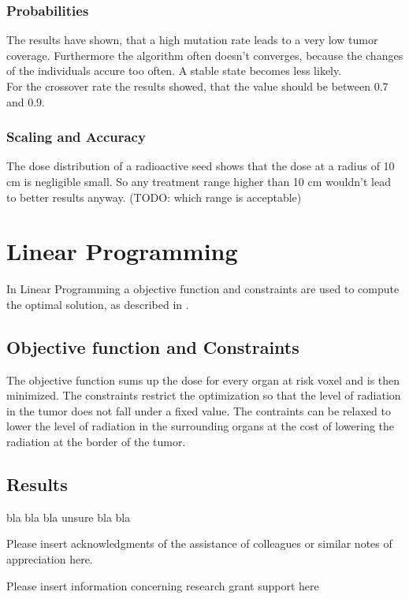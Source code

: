 \documentclass[USenglish,twocolumn]{article}
\begin{document}
\subsubsection{Probabilities} 
The results have shown, that a high mutation rate leads to a very low tumor coverage. Furthermore the algorithm often doesn't converges, because the changes of the individuals accure too often. A stable state becomes less likely. \\ For the crossover rate the results showed, that the value should be between 0.7 and 0.9.

\subsubsection{Scaling and Accuracy}
The dose distribution of a radioactive seed shows that the dose at a radius of 10 cm is negligible small. So any treatment range higher than 10 cm wouldn't lead to better results anyway. (TODO: which range is acceptable)

\section{Linear Programming}
In Linear Programming a objective function and constraints are used to compute the optimal solution, as described in \citep{2}.

\subsection{Objective function and Constraints}
The objective function sums up the dose for every organ at risk voxel and is then minimized. The constraints restrict the optimization so that the level of radiation in the tumor does not fall under a fixed value. The contraints can be relaxed to lower the level of radiation in the surrounding organs at the cost of lowering the radiation at the border of the tumor.

\subsection{Results}
bla bla bla
unsure bla bla

\begin{acknowledgement}
Please insert acknowledgments of the assistance of colleagues or similar notes of appreciation here.
\end{acknowledgement}

\def\acknowledgementname{Funding}
\begin{acknowledgement}
Please insert information concerning research grant support here
\end{acknowledgement}
\end{document}
